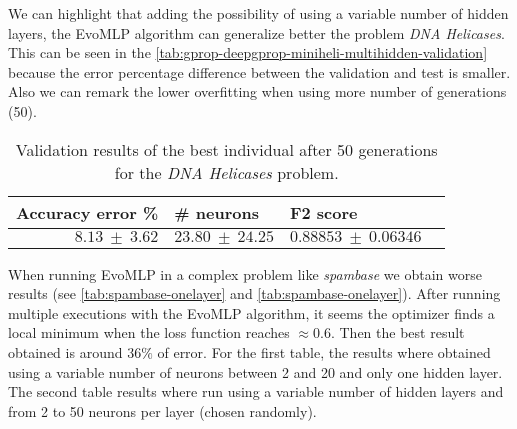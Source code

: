 \documentclass[runningheads]{llncs}
\begin{document}
We can highlight that adding the possibility of using a variable number of
hidden layers, the {\sf EvoMLP} algorithm can generalize better the problem
\emph{DNA Helicases}. This can be seen in the
\autoref{tab:gprop-deepgprop-miniheli-multihidden-validation} because the error
percentage difference between the validation and test is smaller. Also we can
remark the lower overfitting when using more number of generations (50).

\begin{table}
    \centering
    \caption{
        Validation results of the best individual after 50 generations for the
        \emph{DNA Helicases} problem.
    }
    \label{tab:gprop-deepgprop-miniheli-multihidden-validation}
    \begin{tabular}{rlll}
        \textbf{Accuracy error \%} & \textbf{\# neurons} & \textbf{F2 score} \\
        \hline
        $8.13\ \pm\ 3.62$ & $23.80\ \pm\ 24.25$ & $0.88853\ \pm\ 0.06346$ \\
    \end{tabular}
\end{table}


When running {\sf EvoMLP} in a complex problem like \emph{spambase} we obtain
worse results (see \autoref{tab:spambase-onelayer} and
\autoref{tab:spambase-onelayer}). After running multiple executions with the
{\sf EvoMLP} algorithm, it seems the optimizer finds a local minimum when the
loss function reaches $\approx0.6$. Then the best result obtained is around
$36\%$ of error. For the first table, the results where obtained using a
variable number of neurons between 2 and 20 and only one hidden layer. The
second table results where run using a variable number of hidden layers and
from 2 to 50 neurons per layer (chosen randomly).
\end{document}
